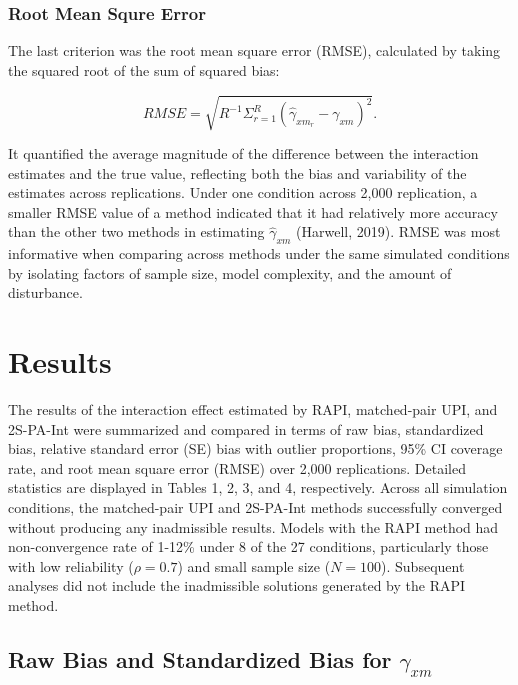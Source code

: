 \documentclass[
  man]{apa6}
\begin{document}
\hypertarget{root-mean-squre-error}{%
\subsubsection{Root Mean Squre Error}\label{root-mean-squre-error}}

The last criterion was the root mean square error (RMSE), calculated by taking the squared root of the sum of squared bias:

\begin{equation}
RMSE = \sqrt{R^{-1}\Sigma^{R}_{r = 1}(\hat{\gamma}_{xm_{r}} - \gamma_{xm})^2}.
\end{equation}

It quantified the average magnitude of the difference between the interaction estimates and the true value, reflecting both the bias and variability of the estimates across replications. Under one condition across 2,000 replication, a smaller RMSE value of a method indicated that it had relatively more accuracy than the other two methods in estimating \(\hat{\gamma}_{xm}\) (Harwell, 2019). RMSE was most informative when comparing across methods under the same simulated conditions by isolating factors of sample size, model complexity, and the amount of disturbance.

\hypertarget{results}{%
\section{Results}\label{results}}

The results of the interaction effect estimated by RAPI, matched-pair UPI, and 2S-PA-Int were summarized and compared in terms of raw bias, standardized bias, relative standard error (SE) bias with outlier proportions, 95\% CI coverage rate, and root mean square error (RMSE) over 2,000 replications. Detailed statistics are displayed in Tables 1, 2, 3, and 4, respectively. Across all simulation conditions, the matched-pair UPI and 2S-PA-Int methods successfully converged without producing any inadmissible results. Models with the RAPI method had non-convergence rate of 1-12\% under 8 of the 27 conditions, particularly those with low reliability (\(\rho = 0.7\)) and small sample size (\(\textit{N} = 100\)). Subsequent analyses did not include the inadmissible solutions generated by the RAPI method.

\hypertarget{raw-bias-and-standardized-bias-for-gamma_xm}{%
\subsection{\texorpdfstring{Raw Bias and Standardized Bias for \(\gamma_{xm}\)}{Raw Bias and Standardized Bias for \textbackslash gamma\_\{xm\}}}\label{raw-bias-and-standardized-bias-for-gamma_xm}}
\end{document}
